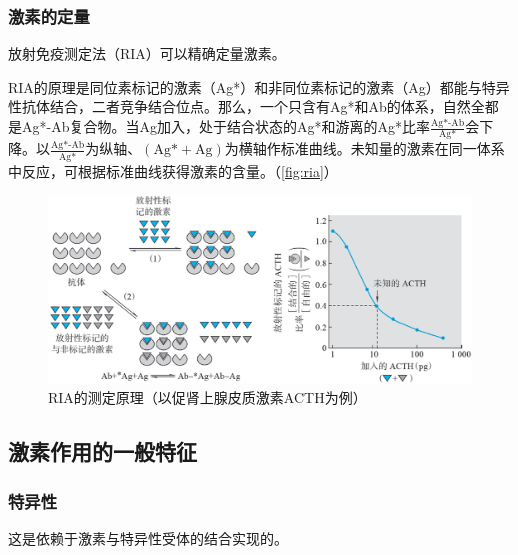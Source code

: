 \subsubsection{激素的定量}

放射免疫测定法（RIA）可以精确定量激素。

RIA的原理是同位素标记的激素（Ag*）和非同位素标记的激素（Ag）都能与特异性抗体结合，二者竞争结合位点。那么，一个只含有Ag*和Ab的体系，自然全都是Ag*-Ab复合物。当Ag加入，处于结合状态的Ag*和游离的Ag*比率$\displaystyle\frac{\text{Ag*-Ab}}{\text{Ag*}}$会下降。以$\displaystyle\frac{\text{Ag*-Ab}}{\text{Ag*}}$为纵轴、$(\text{Ag*}+\text{Ag})$为横轴作标准曲线。未知量的激素在同一体系中反应，可根据标准曲线获得激素的含量。（\autoref{fig:ria}）

\begin{figure}[h]
	\centering
	\includegraphics[width=\textwidth]{Pics/RIA}
	\caption{RIA的测定原理（以促肾上腺皮质激素ACTH为例）}
	\label{fig:ria}
\end{figure}

\subsection{激素作用的一般特征}

\subsubsection{特异性}

这是依赖于激素与特异性受体的结合实现的。

